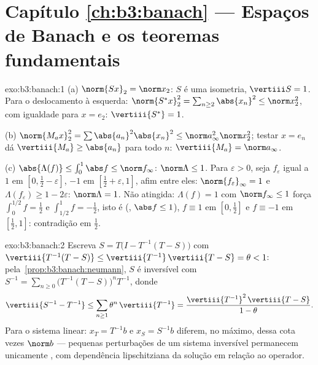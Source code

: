 \section*{Capítulo \ref{ch:b3:banach} --- Espaços de Banach e os
teoremas fundamentais}

\begin{solution}{exo:b3:banach:1}
(a) $\norm{Sx}_2 = \norm x_2$: $S$ é uma isometria, $\vertiii S =
1$. Para o deslocamento à esquerda: $\norm{S^*x}_2^2 = \sum_{n \geq
2}\abs{x_n}^2 \leq \norm x_2^2$, com igualdade para $x = e_2$:
$\vertiii{S^*} = 1$.

(b) $\norm{M_ax}_2^2 = \sum\abs{a_n}^2\abs{x_n}^2 \leq \norm
a_\infty^2\norm x_2^2$; testar $x = e_n$ dá $\vertiii{M_a}
\geq \abs{a_n}$ para todo $n$: $\vertiii{M_a} = \norm a_\infty$.

(c) $\abs{\Lambda(f)} \leq \int_0^1\abs f \leq \norm f_\infty$:
$\norm\Lambda \leq 1$. Para $\varepsilon > 0$, seja $f_\varepsilon$
igual a $1$ em $[0, \frac12 - \varepsilon]$, $-1$ em $[\frac12 +
\varepsilon, 1]$, afim entre eles: $\norm{f_\varepsilon}_\infty =
1$ e $\Lambda(f_\varepsilon) \geq 1 - 2\varepsilon$:
$\norm\Lambda = 1$. Não atingida: $\Lambda(f) = 1$ com $\norm
f_\infty \leq 1$ força $\int_0^{1/2}f = \frac12$ e
$\int_{1/2}^1 f = -\frac12$, isto é (, $\abs f \leq 1$),
$f \equiv 1$ em $[0, \frac12]$ e $f \equiv -1$ em $[\frac12,
1]$: contradição em $\frac12$.
\end{solution}

\begin{solution}{exo:b3:banach:2}
Escreva $S = T\bigl(I - T^{-1}(T - S)\bigr)$ com
$\vertiii{T^{-1}(T-S)} \leq \vertiii{T^{-1}}\,\vertiii{T - S} =
\theta < 1$: pela~\cref{prop:b3:banach:neumann}, $S$ é inversível
com $S^{-1} = \sum_{n\geq0}\bigl(T^{-1}(T -
S)\bigr)^nT^{-1}$, donde
\[
\vertiii{S^{-1} - T^{-1}} \leq
\sum_{n\geq1}\theta^n\,\vertiii{T^{-1}}
= \frac{\vertiii{T^{-1}}^2\,\vertiii{T - S}}{1 - \theta}.
\]
Para o sistema linear: $x_T = T^{-1}b$ e $x_S = S^{-1}b$
diferem, no máximo, dessa cota vezes $\norm b$ --- pequenas
perturbações de um sistema inversível permanecem unicamente ,
com dependência lipschitziana da solução em relação ao operador.
\end{solution}

